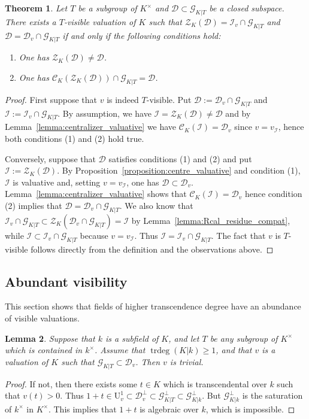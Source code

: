 \documentclass[12pt]{amsart}
\newcommand{\trdeg}{\operatorname{trdeg}}
\newcommand{\Urm}{\mathrm{U}}
\newcommand{\Zcal}{\mathcal{Z}}
\newcommand{\Ccal}{\mathcal{C}}
\newcommand{\Gcal}{\mathcal{G}}
\newcommand{\Dcal}{\mathcal{D}}
\newcommand{\Ical}{\mathcal{I}}
\newtheorem{theorem}{Theorem}[section]
\newtheorem{lemma}[theorem]{Lemma}
\theoremstyle{definition}
\begin{document}
\begin{theorem}\label{theorem:detect_visible_valuations}
  Let $T$ be a subgroup of $K^{\times}$ and $\Dcal \subset \Gcal_{K|T}$ be a closed subspace.
  There exists a $T$-visible valuation of $K$ such that $\Zcal_{K}(\Dcal) = \Ical_{v} \cap \Gcal_{K|T}$ and $\Dcal = \Dcal_{v} \cap \Gcal_{K|T}$ if and only if the following conditions hold:
  \begin{enumerate}
    \item One has $\Zcal_{K}(\Dcal) \neq \Dcal$.
    \item One has $\Ccal_{K}(\Zcal_{K}(\Dcal)) \cap \Gcal_{K|T} = \Dcal$.
  \end{enumerate}
\end{theorem}
\begin{proof}
  First suppose that $v$ is indeed $T$-visible.
  Put $\Dcal := \Dcal_{v} \cap \Gcal_{K|T}$ and $\Ical := \Ical_{v} \cap \Gcal_{K|T}$.
  By assumption, we have $\Ical = \Zcal_{K}(\Dcal) \neq \Dcal$ and by Lemma~\ref{lemma:centralizer_valuative} we have $\Ccal_{K}(\Ical) = \Dcal_{v}$ since $v = v_{\Ical}$, hence both conditions (1) and (2) hold true.

  Conversely, suppose that $\Dcal$ satisfies conditions (1) and (2) and put $\Ical := \Zcal_{K}(\Dcal)$.
  By Proposition~\ref{proposition:centre_valuative} and condition (1), $\Ical$ is valuative and, setting $v = v_{\Ical}$, one has $\Dcal \subset \Dcal_{v}$.
  Lemma~\ref{lemma:centralizer_valuative} shows that $\Ccal_{K}(\Ical) = \Dcal_{v}$ hence condition (2) implies that $\Dcal = \Dcal_{v} \cap \Gcal_{K|T}$.
  We also know that $\Ical_{v} \cap \Gcal_{K|T} \subset \Zcal_{K}(\Dcal_{v} \cap \Gcal_{K|T}) = \Ical$ by Lemma~\ref{lemma:Rcal_residue_compat}, while $\Ical \subset \Ical_{v} \cap \Gcal_{K|T}$ because $v = v_{\Ical}$.
  Thus $\Ical = \Ical_{v} \cap \Gcal_{K|T}$.
  The fact that $v$ is $T$-visible follows directly from the definition and the observations above.
\end{proof}

\subsection{Abundant visibility}

This section shows that fields of higher transcendence degree have an abundance of visible valuations.
\begin{lemma}\label{lemma:pos_trdeg_non_henselian}
  Suppose that $k$ is a subfield of $K$, and let $T$ be any subgroup of $K^{\times}$ which is contained in $k^{\times}$.
  Assume that $\trdeg(K|k) \geq 1$, and that $v$ is a valuation of $K$ such that $\Gcal_{K|T} \subset \Dcal_{v}$.
  Then $v$ is trivial.
\end{lemma}
\begin{proof}
  If not, then there exists some $t \in K$ which is transcendental over $k$ such that $v(t) > 0$.
  Thus $1 + t \in \Urm_{v}^{1} \subset \Dcal_{v}^{\perp} \subset \Gcal_{K|T}^{\perp} \subset \Gcal_{K|k}^{\perp}$.
  But $\Gcal_{K|k}^{\perp}$ is the saturation of $k^{\times}$ in $K^{\times}$.
  This implies that $1+t$ is algebraic over $k$, which is impossible.
\end{proof}
\end{document}
